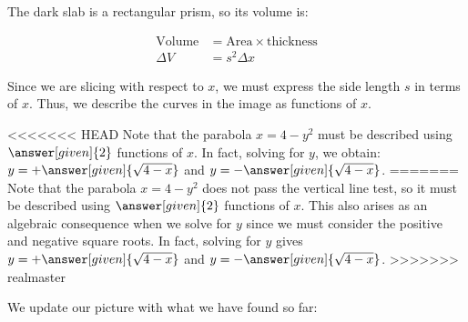 \documentclass{ximera}
\begin{document}
\begin{image}
\end{image}

The dark slab is a rectangular prism, so its volume is:

\begin{align*}
\textrm{Volume} &= \textrm{Area} \times \textrm{thickness} \\
\Delta V &= s^2 \Delta x
\end{align*}

Since we are slicing with respect to $x$, we must express the side length $s$ in terms of $x$.  Thus, we describe the curves in the image as functions of $x$.  

<<<<<<< HEAD
Note that the parabola $x=4-y^2$ must be described using $\answer[given]{2}$ functions of $x$.  In fact, solving for $y$, we obtain: $y=+\answer[given]{\sqrt{4-x}}$ and $y=-\answer[given]{\sqrt{4-x}}$.
=======
Note that the parabola $x=4-y^2$ does not pass the vertical line test, so it must be described using $\answer[given]{2}$ functions of $x$.  This also arises as an algebraic consequence when we solve for $y$ since we must consider the positive and negative square roots.  In fact, solving for $y$ gives $y=+\answer[given]{\sqrt{4-x}}$ and $y=-\answer[given]{\sqrt{4-x}}$.
>>>>>>> realmaster

We update our picture with what we have found so far:
\end{document}
